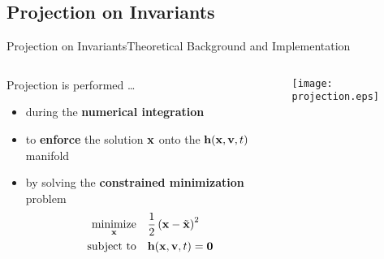 \subsection{Projection on Invariants}

\begin{frame}{Projection on Invariants}{Theoretical Background and Implementation}
  \begin{columns}
    \begin{column}[c]{0.6\textwidth}
      Projection is performed \dots
      \begin{itemize}
        \item during the \textbf{numerical integration}
        \item to \textbf{enforce} the solution $\mathbf{x}$ onto the $\mathbf{h}(\mathbf{x}, \mathbf{v}, t)$ manifold
        \item by solving the \textbf{constrained minimization} problem
          \begin{align*}
            \underset{\mathbf{x}}{\text{minimize}} \quad &\dfrac{1}{2}\left(\mathbf{x} - \tilde{\mathbf{x}}\right)^2 \\
            \text{subject to} \quad &\mathbf{h}(\mathbf{x}, \mathbf{v}, t) = \mathbf{0}
          \end{align*}
        \end{itemize}
      \end{column}
      \begin{column}[c]{0.4\textwidth}
        \hspace{-0.2\textwidth}\texttt{[image: projection.eps]}
      \end{column}
    \end{columns}
    \vspace{1.0em}
\end{frame}


